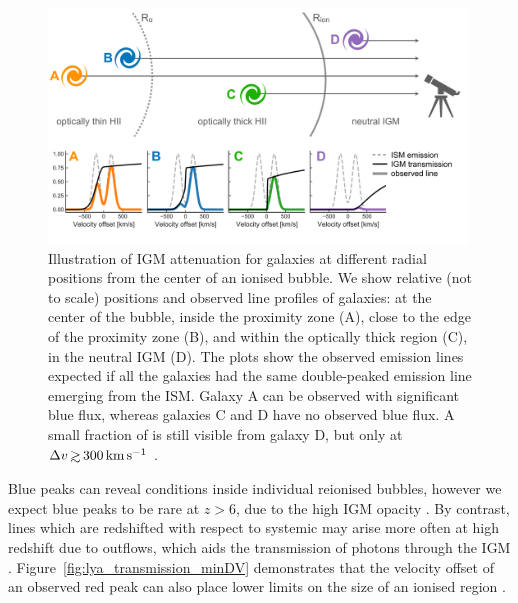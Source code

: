 \documentclass[fleqn,usenatbib]{mnras}
\begin{document}
\begin{figure}
    \includegraphics[width=0.99\textwidth]{figs/fig8.pdf}
    \caption{Illustration of IGM attenuation for galaxies at different radial positions from the center of an ionised bubble. We show relative (not to scale) positions and observed line profiles of galaxies: at the center of the bubble, inside the proximity zone (A), close to the edge of the proximity zone (B), and within the optically thick region (C), in the neutral IGM (D). The plots show the observed \lya emission lines expected if all the galaxies had the same double-peaked emission line emerging from the ISM. Galaxy A can be observed with significant blue flux, whereas galaxies C and D have no observed blue flux. A small fraction of \lya is still visible from galaxy D, but only at $\DV\simgt300\kms$ .}
    \label{fig:cartoon}
\end{figure}

Blue \lya peaks can reveal conditions inside individual reionised bubbles, however we expect blue peaks to be rare at $z>6$, due to the high IGM opacity \citep[see \S~\ref{sec:results_opticallythin} and e.g.,][]{Laursen2011} . By contrast, \lya lines which are redshifted with respect to systemic may arise more often at high redshift due to outflows, which aids the transmission of photons through the IGM \citep{Dijkstra2011}. Figure~\ref{fig:lya_transmission_minDV} demonstrates that the velocity offset of an observed red peak can also place lower limits on the size of an ionised region \citep[see also][]{Malhotra2006}.
\end{document}
